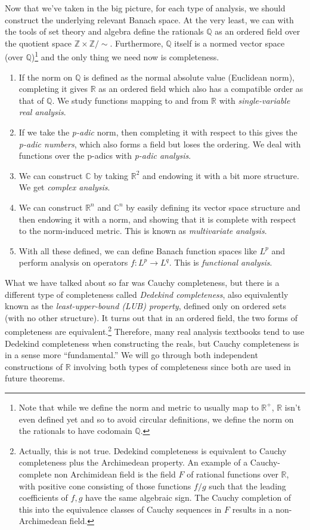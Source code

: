 \documentclass{article}
\begin{document}
  Now that we've taken in the big picture, for each type of analysis, we should construct the underlying relevant Banach space. At the very least, we can with the tools of set theory and algebra define the rationals $\mathbb{Q}$ as an ordered field over the quotient space $\mathbb{Z} \times \mathbb{Z} / \sim$. Furthermore, $\mathbb{Q}$ itself is a normed vector space (over $\mathbb{Q}$)\footnote{Note that while we define the norm and metric to usually map to $\mathbb{R}^+$, $\mathbb{R}$ isn't even defined yet and so to avoid circular definitions, we define the norm on the rationals to have codomain $\mathbb{Q}$. } and the only thing we need now is completeness. 
  \begin{enumerate}
    \item If the norm on $\mathbb{Q}$ is defined as the normal absolute value (Euclidean norm), completing it gives $\mathbb{R}$ as an ordered field which also has a compatible order as that of $\mathbb{Q}$. We study functions mapping to and from $\mathbb{R}$ with \textit{single-variable real analysis}. 
    \item If we take the \textit{p-adic} norm, then completing it with respect to this gives the \textit{p-adic numbers}, which also forms a field but loses the ordering. We deal with functions over the p-adics with \textit{p-adic analysis}. 
    \item We can construct $\mathbb{C}$ by taking $\mathbb{R}^2$ and endowing it with a bit more structure. We get \textit{complex analysis}. 
    \item We can construct $\mathbb{R}^n$ and $\mathbb{C}^n$ by easily defining its vector space structure and then endowing it with a norm, and showing that it is complete with respect to the norm-induced metric. This is known as \textit{multivariate analysis}. 
    \item With all these defined, we can define Banach function spaces like $L^p$ and perform analysis on operators $f: L^p \rightarrow L^q$. This is \textit{functional analysis}. 
  \end{enumerate}
  What we have talked about so far was Cauchy completeness, but there is a different type of completeness called \textit{Dedekind completeness}, also equivalently known as the \textit{least-upper-bound (LUB) property}, defined only on ordered sets (with no other structure). It turns out that in an ordered field, the two forms of completeness are equivalent.\footnote{Actually, this is not true. Dedekind completeness is equivalent to Cauchy completeness plus the Archimedean property. An example of a Cauchy-complete non Archimidean field is the field $F$ of rational functions over $\mathbb{R}$, with positive cone consisting of those functions $f/g$ such that the leading coefficients of $f, g$ have the same algebraic sign. The Cauchy completion of this into the equivalence classes of Cauchy sequences in $F$ results in a non-Archimedean field. } Therefore, many real analysis textbooks tend to use Dedekind completeness when constructing the reals, but Cauchy completeness is in a sense more ``fundamental.'' We will go through both independent constructions of $\mathbb{R}$ involving both types of completeness since both are used in future theorems. 
\end{document}
